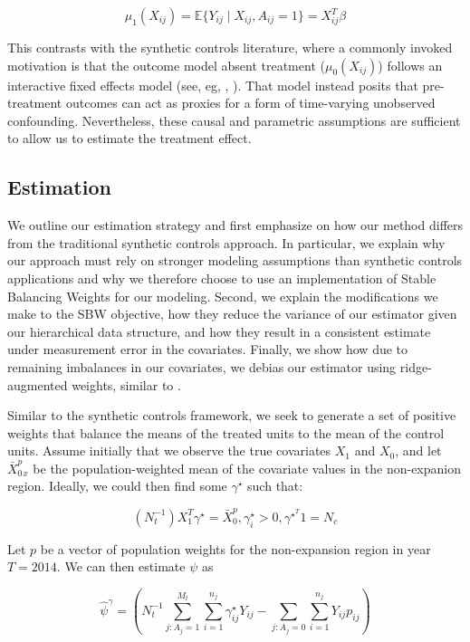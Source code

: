 \documentclass[12pt]{article}
\begin{document}
$$
\mu_1(X_{ij}) = \mathbb{E}\{Y_{ij} \mid X_{ij}, A_{ij} = 1\} = X_{ij}^T\beta
$$

This contrasts with the synthetic controls literature, where a commonly invoked motivation is that the outcome model absent treatment ($\mu_0(X_{ij})$) follows an interactive fixed effects model (see, eg, \cite{abadie2010synthetic}, \cite{ben2018augmented}). That model instead posits that pre-treatment outcomes can act as proxies for a form of time-varying unobserved confounding. Nevertheless, these causal and parametric assumptions are sufficient to allow us to estimate the treatment effect. 

\subsection{Estimation}

We outline our estimation strategy and first emphasize on how our method differs from the traditional synthetic controls approach. In particular, we explain why our approach must rely on stronger modeling assumptions than synthetic controls applications and why we therefore choose to use an implementation of Stable Balancing Weights for our modeling. Second, we explain the modifications we make to the SBW objective, how they reduce the variance of our estimator given our hierarchical data structure, and how they result in a consistent estimate under measurement error in the covariates. Finally, we show how due to remaining imbalances in our covariates, we debias our estimator using ridge-augmented weights, similar to \cite{ben2018augmented}.

Similar to the synthetic controls framework, we seek to generate a set of positive weights that balance the means of the treated units to the mean of the control units. Assume initially that we observe the true covariates $X_1$ and $X_0$, and let $\bar{X}_0^p_x$ be the population-weighted mean of the covariate values in the non-expanion region. Ideally, we could then find some $\gamma^\star$ such that: 

$$
(N_t^{-1})X_1^T\gamma^\star = \bar{X}_0^p, \gamma_i^\star > 0, \gamma^\star^T1 = N_c
$$

Let $p$ be a vector of population weights for the non-expansion region in year $T = 2014$. We can then estimate $\psi$ as

$$
\hat{\psi}^{\gamma} = (N_t^{-1}\sum_{j: A_j = 1}^{M_t}\sum_{i = 1}^{n_j}\gamma_{ij}^\star Y_{ij} - \sum_{j: A_j = 0}\sum_{i = 1}^{n_j}Y_{ij}p_{ij})
$$
\end{document}
